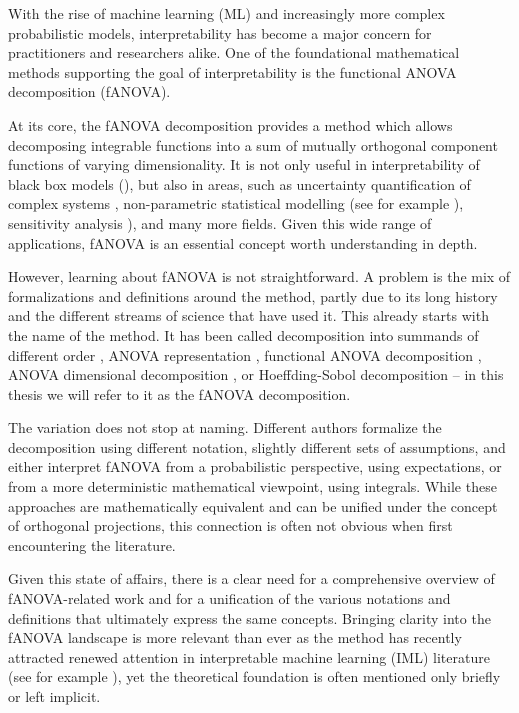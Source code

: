 With the rise of machine learning (ML) and increasingly more complex probabilistic models, interpretability has become a major concern for practitioners and researchers alike. One of the foundational mathematical methods supporting the goal of interpretability is the functional ANOVA decomposition (fANOVA).

At its core, the fANOVA decomposition provides a method which allows decomposing integrable functions into a sum of mutually orthogonal component functions of varying dimensionality.
It is not only useful in interpretability of black box models (\cite{hooker2004, molnar2025}), but also in areas, such as uncertainty quantification of complex systems \cite{rahman2014}, non-parametric statistical modelling (see for example \cite{stone1997}), sensitivity analysis \cite{sobol1993sensitivity}), and many more fields.
Given this wide range of applications, fANOVA is an essential concept worth understanding in depth.\par

However, learning about fANOVA is not straightforward.
A problem is the mix of formalizations and definitions around the method, partly due to its long history and the different streams of science that have used it.
This already starts with the name of the method. It has been called decomposition into summands of different order \citep{sobol1993sensitivity}, ANOVA representation \citep{sobol2001}, functional ANOVA decomposition \citep{hooker2004}, ANOVA dimensional decomposition \citep{rahman2014}, or Hoeffding-Sobol decomposition \citep{chastaing2012} – in this thesis we will refer to it as the fANOVA decomposition.\par
The variation does not stop at naming. Different authors formalize the decomposition using different notation, slightly different sets of assumptions, and either interpret fANOVA from a probabilistic perspective, using expectations, or from a more deterministic mathematical viewpoint, using integrals.
While these approaches are mathematically equivalent and can be unified under the concept of orthogonal projections, this connection is often not obvious when first encountering the literature.\par


Given this state of affairs, there is a clear need for a comprehensive overview of fANOVA-related work and for a unification of the various notations and definitions that ultimately express the same concepts.
Bringing clarity into the fANOVA landscape is more relevant than ever as the method has recently attracted renewed attention in interpretable machine learning (IML) literature (see for example \cite{hu2025}), yet the theoretical foundation is often mentioned only briefly or left implicit.\par

